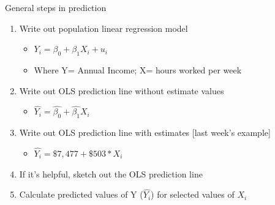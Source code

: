 \documentclass[
  8pt,
  ignorenonframetext,
  dvipsnames]{beamer}
\providecommand{\tightlist}{%
  \setlength{\itemsep}{0pt}\setlength{\parskip}{0pt}}
\let\olditem\item
\renewcommand{\item}{%
  \olditem\vspace{4pt}
}
\begin{document}
\begin{frame}{General steps in prediction}
\protect\hypertarget{general-steps-in-prediction}{}

\begin{enumerate}
\item
  Write out population linear regression model

  \begin{itemize}
  \tightlist
  \item
    \(Y_i = \beta_0 + \beta_1X_i + u_i\)
  \item
    Where Y= Annual Income; X= hours worked per week
  \end{itemize}
\item
  Write out OLS prediction line without estimate values

  \begin{itemize}
  \tightlist
  \item
    \(\hat{Y_i} = \hat{\beta_0} + \hat{\beta_1}X_i\)
  \end{itemize}
\item
  Write out OLS prediction line with estimates {[}last week's example{]}

  \begin{itemize}
  \tightlist
  \item
    \(\hat{Y_i} = \$7,477 + \$503*X_i\)
  \end{itemize}
\item
  If it's helpful, sketch out the OLS prediction line
\item
  Calculate predicted values of Y (\(\hat{Y_i}\)) for selected values of
  \(X_i\)
\end{enumerate}

\end{frame}
\end{document}
